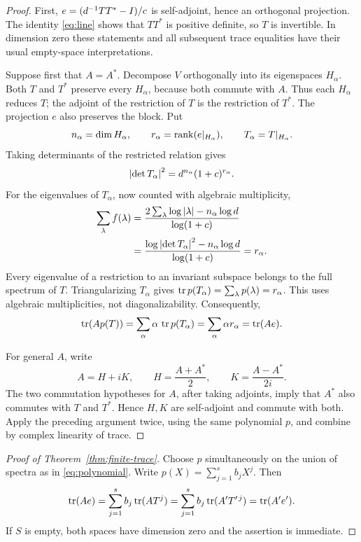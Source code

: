 \begin{proof}
First, \(e=(d^{-1}TT^*-I)/c\) is self-adjoint, hence an orthogonal projection.
The identity \eqref{eq:line} shows that \(TT^*\) is positive definite, so \(T\)
is invertible. In dimension zero these statements and all subsequent trace
equalities have their usual empty-space interpretations.

Suppose first that \(A=A^*\). Decompose \(V\) orthogonally into its eigenspaces
\(H_\alpha\). Both \(T\) and \(T^*\) preserve every \(H_\alpha\), because both commute
with \(A\). Thus each \(H_\alpha\) reduces \(T\); the adjoint of the restriction of
\(T\) is the restriction of \(T^*\). The projection \(e\) also preserves the block.
Put
\[
 n_\alpha=\dim H_\alpha,\qquad
 r_\alpha=\operatorname{rank}(e|_{H_\alpha}),\qquad T_\alpha=T|_{H_\alpha}.
\]
Taking determinants of the restricted relation gives
\begin{equation}\label{eq:block-det}
 \left|\det T_\alpha\right|^2
       =d^{n_\alpha}(1+c)^{r_\alpha}.
\end{equation}
For the eigenvalues of \(T_\alpha\), now counted with algebraic multiplicity,
\begin{align*}
 \sum_\lambda f(\lambda)
 &=\frac{2\sum_\lambda\log\left|\lambda\right|-n_\alpha\log d}{\log(1+c)}\\
 &=\frac{\log\left|\det T_\alpha\right|^2-n_\alpha\log d}{\log(1+c)}
 =r_\alpha.
\end{align*}
Every eigenvalue of a restriction to an invariant subspace belongs to the full
spectrum of \(T\). Triangularizing \(T_\alpha\) gives
\(\operatorname{tr} p(T_\alpha)=\sum_\lambda p(\lambda)=r_\alpha\).
This uses algebraic multiplicities, not diagonalizability. Consequently,
\[
 \operatorname{tr}(Ap(T))=\sum_\alpha\alpha\,\operatorname{tr} p(T_\alpha)
            =\sum_\alpha\alpha r_\alpha
            =\operatorname{tr}(Ae).
\]

For general \(A\), write
\[
 A=H+iK,\qquad H=\frac{A+A^*}{2},\qquad K=\frac{A-A^*}{2i}.
\]
The two commutation hypotheses for \(A\), after taking adjoints, imply that
\(A^*\) also commutes with \(T\) and \(T^*\). Hence \(H,K\) are self-adjoint
and commute with both. Apply the preceding argument twice, using the same
polynomial \(p\), and combine by complex linearity of trace.
\end{proof}

\begin{proof}[Proof of Theorem~\ref{thm:finite-trace}]
Choose \(p\) simultaneously on the union of spectra as in \eqref{eq:polynomial}.
Write \(p(X)=\sum_{j=1}^{s}b_jX^j\). Then
\[
 \operatorname{tr}(Ae)=\sum_{j=1}^{s}b_j\operatorname{tr}(AT^j)
        =\sum_{j=1}^{s}b_j\operatorname{tr}(A'T'^{\,j})
        =\operatorname{tr}(A'e').
\]
If \(S\) is empty, both spaces have dimension zero and the assertion is immediate.
\end{proof}

